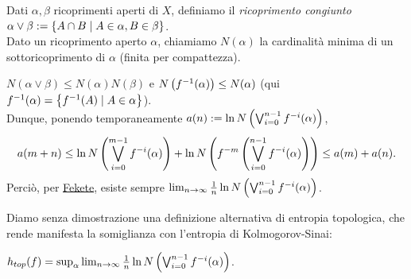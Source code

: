 \begin{defi}Dati $\alpha,\beta$ ricoprimenti aperti di $X$, definiamo il \emph{ricoprimento congiunto}
$\alpha\vee\beta:=\left\{A\cap B\mid A\in\alpha,B\in\beta\right\}$. \\
Dato un ricoprimento aperto $\alpha$, chiamiamo $N(\alpha)$ la cardinalità minima di un sottoricoprimento di $\alpha$
(finita per compattezza).
\end{defi}

\begin{oss}$N(\alpha\vee\beta)\le N(\alpha)N(\beta)$ e $N\left(f^{-1}(\alpha)\right)\le N(\alpha)$
(qui $f^{-1}(\alpha)=\left\{f^{-1}(A)\mid A\in\alpha\right\}$). \\
Dunque, ponendo temporaneamente $a(n):=\ln N\left(\bigvee_{i=0}^{n-1}f^{-i}(\alpha)\right)$,
\[ a(m+n)\le\ln N\left(\bigvee_{i=0}^{m-1}f^{-i}(\alpha)\right)+\ln N\left(f^{-m}\left(\bigvee_{i=0}^{n-1}f^{-i}(\alpha)\right)\right)
\le a(m)+a(n). \]
Perciò, per \hyperref[fekete]{Fekete}, esiste sempre $\lim_{n\to\infty}\frac{1}{n}\ln N\left(\bigvee_{i=0}^{n-1}f^{-i}(\alpha)\right)$.
\end{oss}

Diamo senza dimostrazione una definizione alternativa di entropia topologica, che rende manifesta la somiglianza con l'entropia
di Kolmogorov-Sinai:

\begin{teo}$h_{top}(f)=\sup_\alpha\lim_{n\to\infty}\frac{1}{n}\ln N\left(\bigvee_{i=0}^{n-1}f^{-i}(\alpha)\right)$.
\end{teo}

